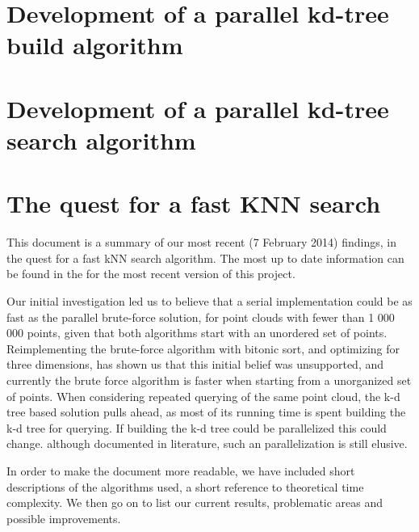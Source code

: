
\section{Development of a parallel kd-tree build algorithm} %
\label{sub:development_of_a_parallel_kd_tree_build_algorithm}



\section{Development of a parallel kd-tree search algorithm} %
\label{sub:development_of_a_parallel_kd_tree_search_algorithm}


\section{The quest for a fast KNN search} %
\label{sec:the_quest_for_a_fast_KNN_search}

This document is a summary of our most recent (7 February 2014) findings, in the quest for a fast kNN search algorithm. The most up to date information can be found in the
for the most recent version of this project.

Our initial investigation led us to believe that a serial implementation could be as fast as the parallel brute-force solution, for point clouds with fewer than 1 000 000 points, given that both algorithms start with an unordered set of points. Reimplementing the brute-force algorithm with bitonic sort, and optimizing for three dimensions, has shown us that this initial belief was unsupported, and currently the brute force algorithm is faster when starting from a unorganized set of points. When considering repeated querying of the same point cloud, the k-d tree based solution pulls ahead, as most of its running time is spent building the k-d tree for querying. If building the k-d tree could be parallelized this could change. although documented in literature, such an parallelization is still elusive.

In order to make the document more readable, we have included short descriptions of the algorithms used, a short reference to theoretical time complexity. We then go on to list our current results, problematic areas and possible improvements.

